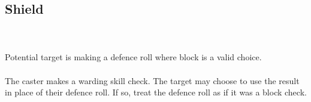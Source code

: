 \subsection*{Shield}
 \\
 \\
{
    Potential target is making a defence roll where block is a valid choice.
} \\
 \\

The caster makes a warding skill check. The target may choose to use the result
in place of their defence roll. If so, treat the defence roll as if it was a
block check.
